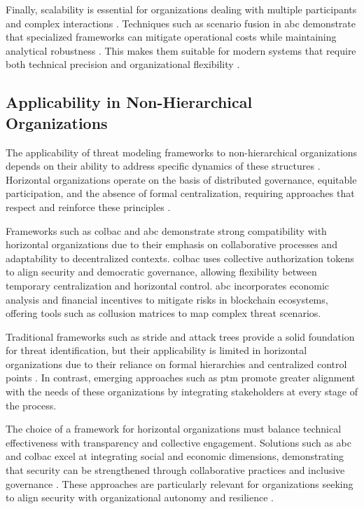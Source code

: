 Finally, scalability is essential for organizations dealing with multiple
participants and complex interactions \cite{AbcCrypto}. Techniques such as
scenario fusion in \gls{abc} demonstrate that specialized frameworks can
mitigate operational costs while maintaining analytical robustness
\cite{AbcCrypto}. This makes them suitable for modern systems that require both
technical precision and organizational flexibility \cite{Colbac}.

\subsection{Applicability in Non-Hierarchical Organizations}
\label{subsec:applicability_nonhierarchical_orgs}

The applicability of threat modeling frameworks to non-hierarchical
organizations depends on their ability to address specific dynamics of these
structures \cite{Colbac, ThreatModelingASystematicLiteratureReview}. Horizontal
organizations operate on the basis of distributed governance, equitable
participation, and the absence of formal centralization, requiring approaches
that respect and reinforce these principles \cite{EverydayRevolutions}.

Frameworks such as \gls{colbac} and \gls{abc} demonstrate strong compatibility
with horizontal organizations due to their emphasis on collaborative processes
and adaptability to decentralized contexts. \gls{colbac} uses collective
authorization tokens to align security and democratic governance, allowing
flexibility between temporary centralization and horizontal control. \gls{abc}
incorporates economic analysis and financial incentives to mitigate risks in
blockchain ecosystems, offering tools such as collusion matrices to map complex
threat scenarios.

Traditional frameworks such as \gls{stride} and attack trees provide a solid
foundation for threat identification, but their applicability is limited in
horizontal organizations due to their reliance on formal hierarchies and
centralized control points \cite{ThreatModelingdesigningForSecurity,
AttackTrees}. In contrast, emerging approaches such as \gls{ptm} promote greater
alignment with the needs of these organizations by integrating stakeholders at
every stage of the process.

The choice of a framework for horizontal organizations must balance technical
effectiveness with transparency and collective engagement. Solutions such as
\gls{abc} and \gls{colbac} excel at integrating social and economic dimensions,
demonstrating that security can be strengthened through collaborative practices
and inclusive governance \cite{AbcCrypto, Colbac}. These approaches are
particularly relevant for organizations seeking to align security with
organizational autonomy and resilience \cite{Colbac}.

